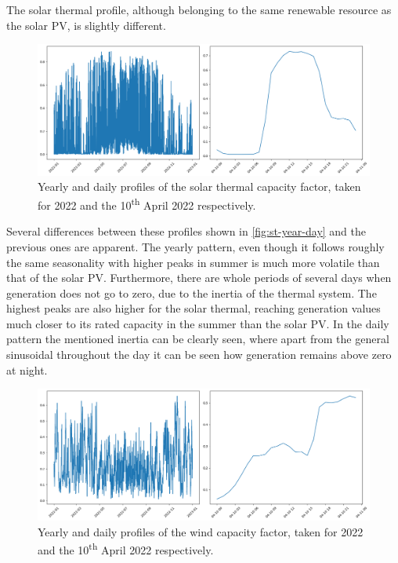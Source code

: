 The solar thermal profile, although belonging to the same renewable resource as the solar PV, is slightly different. 
\begin{figure}[ht]
    \centering
    \captionsetup{justification=centering}
    \includegraphics[width=\linewidth]{assets/st-year-day.png}
    \caption{Yearly and daily profiles of the solar thermal capacity factor, taken for 2022 and the 10\textsuperscript{th} April 2022 respectively.}
    \label{fig:st-year-day}
\end{figure}

Several differences between these profiles shown in \autoref{fig:st-year-day} and the previous ones are apparent. The yearly pattern, even though it follows roughly the same seasonality with higher peaks in summer is much more volatile than that of the solar PV. Furthermore, there are whole periods of several days when generation does not go to zero, due to the inertia of the thermal system. The highest peaks are also higher for the solar thermal, reaching generation values much closer to its rated capacity in the summer than the solar PV. In the daily pattern the mentioned inertia can be clearly seen, where apart from the general sinusoidal throughout the day it can be seen how generation remains above zero at night.

\begin{figure}[ht]
    \centering
    \captionsetup{justification=centering}
    \includegraphics[width=\linewidth]{assets/w-year-day.png}
    \caption{Yearly and daily profiles of the wind capacity factor, taken for 2022 and the 10\textsuperscript{th} April 2022 respectively.}
    \label{fig:w-year-day}
\end{figure}

